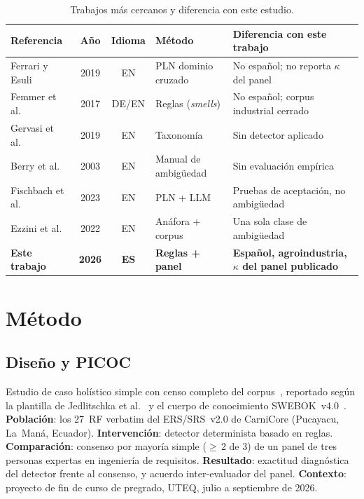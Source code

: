 \documentclass[runningheads]{llncs}
\begin{document}
\begin{table}[t]
\centering
\caption{Trabajos más cercanos y diferencia con este estudio.}
\label{tab:related}
\begin{tabular}{p{2.6cm}cc p{2.5cm} p{3.2cm}}
\toprule
\textbf{Referencia} & \textbf{Año} & \textbf{Idioma} & \textbf{Método} &
\textbf{Diferencia con este trabajo} \\
\midrule
Ferrari y Esuli~\cite{ferrari2019nlp} & 2019 & EN & PLN dominio cruzado &
No español; no reporta $\kappa$ del panel \\
Femmer et al.~\cite{femmer2017smells} & 2017 & DE/EN & Reglas (\textit{smells}) &
No español; corpus industrial cerrado \\
Gervasi et al.~\cite{gervasi2019ambiguity} & 2019 & EN & Taxonomía &
Sin detector aplicado \\
Berry et al.~\cite{berry2003ambiguity} & 2003 & EN & Manual de ambigüedad &
Sin evaluación empírica \\
Fischbach et al.~\cite{fischbach2023acceptance} & 2023 & EN & PLN + LLM &
Pruebas de aceptación, no ambigüedad \\
Ezzini et al.~\cite{ezzini2022automated} & 2022 & EN & Anáfora + corpus &
Una sola clase de ambigüedad \\
\textbf{Este trabajo} & \textbf{2026} & \textbf{ES} & \textbf{Reglas + panel} &
\textbf{Español, agroindustria, $\kappa$ del panel publicado} \\
\bottomrule
\end{tabular}
\end{table}

\section{Método}
\label{sec:method}

\subsection{Diseño y PICOC}

Estudio de caso holístico simple con censo completo del
corpus~\cite{runeson2009,yin2018case}, reportado según la plantilla de
Jedlitschka et al.~\cite{jedlitschka2008} y el cuerpo de conocimiento
SWEBOK~v4.0~\cite{swebok2024}.
\textbf{Población}: los 27~RF verbatim del ERS/SRS~v2.0 de CarniCore
(Pucayacu, La~Man\'{a}, Ecuador).
\textbf{Intervención}: detector determinista basado en reglas.
\textbf{Comparación}: consenso por mayoría simple ($\geq$\,2 de 3) de un panel
de tres personas expertas en ingeniería de requisitos.
\textbf{Resultado}: exactitud diagnóstica del detector frente al consenso, y
acuerdo inter-evaluador del panel.
\textbf{Contexto}: proyecto de fin de curso de pregrado, UTEQ, julio a
septiembre de 2026.
\end{document}
